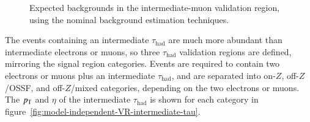 \begin{figure}[tbp]
  \hfill
  \caption{Expected backgrounds in the intermediate-muon validation region, using the
    nominal background estimation techniques.}
  \label{fig:model-independent-VR-intermediate-mu}
\end{figure}

The events containing an intermediate $\tau_{\mathrm{had}}$ are much more abundant than intermediate electrons or muons, so three $\tau_{\mathrm{had}}$ validation regions are defined, mirroring the signal region categories. Events are required to contain two electrons or muons plus an intermediate $\tau_{\mathrm{had}}$, and are separated into on-$Z$, off-$Z$/OSSF, and off-$Z$/mixed categories, depending on the two electrons or muons. The $p_{\text{T}}$ and $\eta$ of the intermediate $\tau_{\mathrm{had}}$ is shown for each category in figure~\ref{fig:model-independent-VR-intermediate-tau}.

